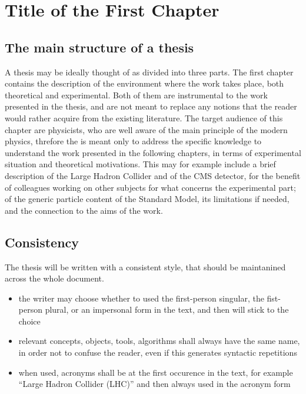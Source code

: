 \chapter{Title of the First Chapter}


\section{The main structure of a thesis}

A thesis may be ideally thought of as divided into three parts.
The first chapter contains the description of the environment where the work takes place,
both theoretical and experimental.
Both of them are instrumental to the work presented in the thesis, 
and are not meant to replace any notions that the reader would rather acquire 
from the existing literature.
The target audience of this chapter are physicists,
who are well aware of the main principle of the modern physics,
threfore the is meant only to address the specific knowledge to understand the work presented
in the following chapters,
in terms of experimental situation and theoretical motivations.
This may for example include a brief description of the Large Hadron Collider
and of the CMS detector, for the benefit of colleagues working on other subjects
for what concerns the experimental part; 
of the generic particle content of the Standard Model,
its limitations if needed,
and the connection to the aims of the work.


\section{Consistency}

The thesis will be written with a consistent style,
that should be maintanined across the whole document.
\begin{itemize}
\item the writer may choose whether to used the first-person singular, 
      the fist-person plural, or an impersonal form in the text, 
      and then will stick to the choice
\item relevant concepts, objects, tools, algorithms shall always have the same name,
      in order not to confuse the reader, even if this generates syntactic repetitions
\item when used, acronyms shall be at the first occurence in the text, for example
      ``Large Hadron Collider (LHC)'' and then always used in the acronym form
\end{itemize}	


